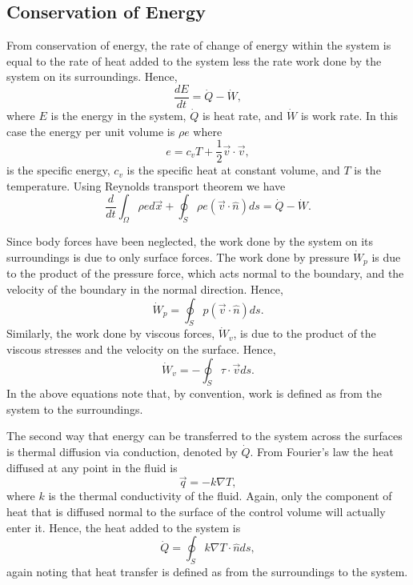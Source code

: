 \subsection{Conservation of Energy}
From conservation of energy, the rate of change of energy within the system is equal to the rate of heat added to the system less the rate work done by the system on its surroundings. Hence,
\begin{equation}
	\frac{dE}{dt} = \dot{Q}-\dot{W},
\end{equation}
where $E$ is the energy in the system, $\dot{Q}$ is heat rate, and $\dot {W}$ is work rate. In this case the energy per unit volume is $\rho e$ where 
\begin{equation}
e = c_v T + \frac{1}{2} \vec{v} \cdot \vec{v},
\end{equation} 
is the specific energy, $c_v$ is the specific heat at constant volume, and $T$ is the temperature. Using Reynolds transport theorem we have
\begin{equation}
\frac{d}{dt}\int_\Omega \rho e d\vec{x} + \oint_S \rho e (\vec{v} \cdot \hat{n}) ds = \dot{Q}-\dot{W}.
\end{equation}

Since body forces have been neglected, the work done by the system on its surroundings is due to only surface forces. The work done by pressure $\dot{W}_p$ is due to the product of the pressure force, which acts normal to the boundary, and the velocity of the boundary in the normal direction. Hence,
\begin{equation}
	\dot{W}_p = \oint_S p(\vec{v} \cdot \hat{n}) ds.
\end{equation}
Similarly, the work done by viscous forces, $\dot{W}_v$, is due to the product of the viscous stresses and the velocity on the surface. Hence, 
\begin{equation}
	\dot{W}_v = -\oint_S \tau \cdot \vec{v} ds.
\end{equation}
In the above equations note that, by convention, work is defined as from the system to the surroundings.

The second way that energy can be transferred to the system across the surfaces is thermal diffusion via conduction, denoted by $\dot{Q}$. From Fourier's law the heat diffused at any point in the fluid is
\begin{equation}
	\vec{q} = -k \nabla T,
\end{equation}
where $k$ is the thermal conductivity of the fluid. Again, only the component of heat that is diffused normal to the surface of the control volume will actually enter it. Hence, the heat added to the system is
\begin{equation}
	\dot{Q} = \oint_S k \nabla T \cdot \hat{n} ds,
\end{equation}
again noting that heat transfer is defined as from the surroundings to the system.

